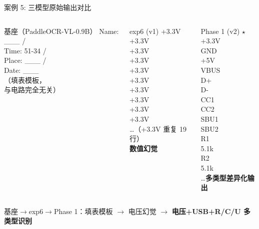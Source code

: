 \documentclass[10pt,aspectratio=169,table]{beamer}
\begin{document}
\begin{frame}{案例 5: 三模型原始输出对比}
  \begin{columns}[T]
      \begin{block}{\footnotesize 基座（PaddleOCR-VL-0.9B）}
        \ttfamily\tiny
        Name: \_\_\_ /\\
        Time: 51-34 /\\
        Place: \_\_\_ /\\
        Date: \_\_\_ \\
        （填表模板，\\
        与电路完全无关）
      \end{block}
      \begin{block}{\footnotesize exp6 (v1)}
        \ttfamily\tiny
        +3.3V\\
        +3.3V\\
        +3.3V\\
        +3.3V\\
        +3.3V\\
        +3.3V\\
        +3.3V\\
        +3.3V\\
        +3.3V\\
        +3.3V\\
        \ldots（+3.3V 重复 19 行）\\
        \textbf{数值幻觉}
      \end{block}
      \begin{block}{\footnotesize Phase 1 (v2) $\star$}
        \ttfamily\tiny
        +3.3V\\
        GND\\
        +5V\\
        VBUS\\
        D+\\
        D-\\
        CC1\\
        CC2\\
        SBU1\\
        SBU2\\
        R1\\
        5.1k\\
        R2\\
        5.1k\\
        \ldots\textbf{多类型差异化输出}
      \end{block}
  \end{columns}
  \vspace{0.2cm}
  \begin{center}
    \footnotesize 基座$\to$exp6$\to$Phase 1：填表模板 $\to$ 电压幻觉 $\to$ \textbf{电压+USB+R/C/U 多类型识别}
  \end{center}
\end{frame}
\end{document}
